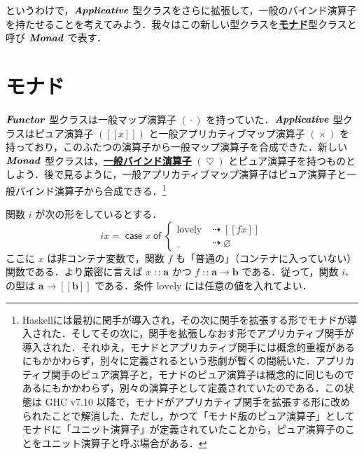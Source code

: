 \documentclass[a5paper,twoside,fleqn,draft]{jsbook}
\def\[{[\![}
\def\]{]\!]}
\newcommand{\programminglanguage}[1]{\textsf{#1}}
\newcommand{\haskell}{\programminglanguage{Haskell}}
\newcommand{\keyword}[1]{{\underline{\textbf{#1}}}}
\newcommand{\mKeyword}[1]{\mathsf{#1}}
\newcommand{\mCaseKeyword}{\mKeyword{case}}
\newcommand{\mOfKeyword}{\mKeyword{of}}
\DeclareMathOperator{\mCaseKW}{\mCaseKeyword}
\DeclareMathOperator{\mOfKW}{\mOfKeyword}
\newcommand{\mPureNothing}{\varnothing}
\newcommand{\mSpecialVar}[1]{\textrm{#1}}
\newcommand{\mLovelyVar}{\mSpecialVar{lovely}}
\DeclareMathOperator{\mAppMap}{\times}
\DeclareMathOperator{\mBind}{\heartsuit}
\DeclareMathOperator{\mBindMaybe}{\spadesuit}
\DeclareMathOperator{\mFuncArrow}{\rightarrow}
\DeclareMathOperator{\mIfSo}{\dashrightarrow}
\DeclareMathOperator{\mIn}{{:\!:}}
\DeclareMathOperator{\mMap}{\cdot}
\newcommand{\mType}[1]{\mathbf{#1}} %
\newcommand{\mA}{\mType{a}}
\newcommand{\mB}{\mType{b}}
\newcommand{\mPureType}[1]{\[\mType{#1}\]}
\newcommand{\mPureWith}[1]{\[#1\]}
\newcommand{\mTypeClass}[1]{\textbf{\textit{#1}}}
\newcommand{\mApplicativeTypeClass}{\mTypeClass{Applicative}}
\newcommand{\mFunctorTypeClass}{\mTypeClass{Functor}}
\newcommand{\mMonadTypeClass}{\mTypeClass{Monad}}
\newcommand{\mMaybe}[1]{{#1}_?}
\newcommand{\mContainer}[1]{{#1}_*}
\newcommand{\mCaseOf}[1]{\mCaseKW#1\mOfKW}
\begin{document}

というわけで，$\mApplicativeTypeClass$ 型クラスをさらに拡張して，一般のバインド演算子を持たせることを考えてみよう．我々はこの新しい型クラスを\keyword{モナド}型クラスと呼び $\mMonadTypeClass$ で表す．

\section{モナド}

$\mFunctorTypeClass$ 型クラスは一般マップ演算子 $(\mMap)$ を持っていた．$\mApplicativeTypeClass$ 型クラスはピュア演算子 $(\mPureWith{x})$ と一般アプリカティブマップ演算子 $(\mAppMap)$ を持っており，このふたつの演算子から一般マップ演算子を合成できた．新しい $\mMonadTypeClass$ 型クラスは，\keyword{一般バインド演算子} $(\mBind)$ とピュア演算子を持つものとしよう．後で見るように，一般アプリカティブマップ演算子はピュア演算子と一般バインド演算子から合成できる．\footnote{\haskell には最初に関手が導入され，その次に関手を拡張する形でモナドが導入された．そしてその次に，関手を拡張しなおす形でアプリカティブ関手が導入された．それゆえ，モナドとアプリカティブ関手には概念的重複があるにもかかわらず，別々に定義されるという悲劇が暫くの間続いた．アプリカティブ関手のピュア演算子と，モナドのピュア演算子は概念的に同じものであるにもかかわらず，別々の演算子として定義されていたのである．この状態は GHC v7.10 以降で，モナドがアプリカティブ関手を拡張する形に改められたことで解消した．ただし，かつて「モナド版のピュア演算子」としてモナドに「ユニット演算子」が定義されていたことから，ピュア演算子のことをユニット演算子と呼ぶ場合がある．}

関数 $i$ が次の形をしているとする．
\begin{equation}
  \label{eq:def-of-i}
  ix=\mCaseOf{x}\begin{cases}
    \mLovelyVar
    &\mIfSo\mPureWith{fx}\\
    \_
    &\mIfSo\mPureNothing
  \end{cases}
\end{equation}
ここに $x$ は非コンテナ変数で，関数 $f$ も「普通の」（コンテナに入っていない）関数である．より厳密に言えば $x\mIn\mA$ かつ $f\mIn\mA\mFuncArrow\mB$ である．従って，関数 $\mContainer{i}$ の型は $\mA\mFuncArrow\mPureType{b}$ である．条件 $\mLovelyVar$ には任意の値を入れてよい．
\end{document}
